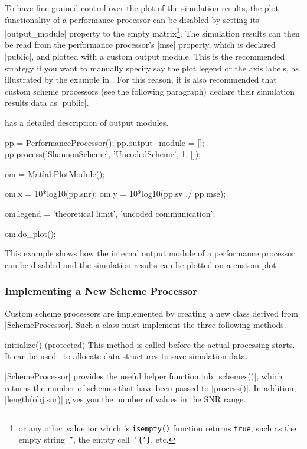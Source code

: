 To have fine grained control over the plot of the simulation results, the plot
functionality of a performance processor can be disabled by setting its
|output_module| property to the empty matrix\footnote{or
any other value for which \matlab's \texttt{isempty()} function returns
\texttt{true}, such as the empty string~\texttt{''}, the empty
cell~\texttt{\char`\{\char`\}}, etc.}. The simulation results can then be read
from the performance processor's |mse| property, which is declared |public|, and
plotted with a custom output module. This is the recommended strategy if you
want to manually specify say the plot legend or the axis labels, as illustrated
by the example in . For this reason, it is also recommended
that custom scheme processors (see the following paragraph) declare their
simulation results data as |public|. 

 has a detailed description of output modules.

\begin{listing}
\begin{Code}
  pp = PerformanceProcessor();
  pp.output_module = [];  %
  pp.process({'ShannonScheme', 'UncodedScheme'}, {1, []});

  om = MatlabPlotModule();

  om.x = 10*log10(pp.snr);  %
  om.y = 10*log10(pp.sv ./ pp.mse);  %

  om.legend = {'theoretical limit', 'uncoded communication'};

  om.do_plot();
\end{Code}
\caption{This example shows how the internal output module of a performance
processor can be disabled and the simulation results can be plotted on a custom
plot.}
\label{lst:customppplot}
\end{listing}


\subsubsection{Implementing a New Scheme Processor}

Custom scheme processors are implemented by creating a new class derived from
|SchemeProcessor|. Such a class must implement the three following methods.

\begin{method}{initialize(\obj) (protected)}
  This method is called before the actual processing starts. It can be used \eg\
  to allocate data structures to save simulation data.

  |SchemeProcessor| provides the useful helper function |nb_schemes()|, which
  returns the number of schemes that have been passed to |process()|. In
  addition, |length(obj.snr)| gives you the number of values in the SNR range.
\end{method}

